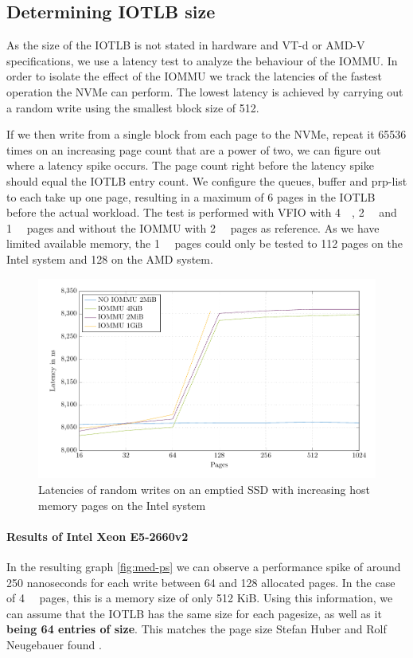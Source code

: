 \subsection{Determining IOTLB size}
As the size of the IOTLB is not stated in hardware and VT-d or AMD-V specifications, we use a latency test to analyze the behaviour of the IOMMU.
In order to isolate the effect of the IOMMU we track the latencies of the fastest operation the NVMe can perform. The lowest latency is achieved by carrying out a random write using the smallest block size of \qty{512}{\byte}.

If we then write from a single block from each page to the NVMe, repeat it 65536 times on an increasing page count that are a power of two, we can figure out where a latency spike occurs. The page count right before the latency spike should equal the IOTLB entry count. We configure the queues, buffer and prp-list to each take up one page, resulting in a maximum of 6 pages in the IOTLB before the actual workload.
The test is performed with VFIO with \qty{4}{\kibi\byte}, \qty{2}{\mebi\byte} and \qty{1}{\gibi\byte} pages and without the IOMMU with \qty{2}{\mebi\byte} pages as reference. As we have limited available memory, the \qty{1}{\gibi\byte} pages could only be tested to 112 pages on the Intel system and 128 on the AMD system.

\begin{figure}[H]
  \centering
  \includegraphics[width=\textwidth]{figures/psmeds}
  \caption{Latencies of random writes on an emptied SSD with increasing host memory pages on the Intel system}
  \label{fig:med-ps}
\end{figure}

\paragraph{Results of Intel Xeon E5-2660v2}
In the resulting graph \autoref{fig:med-ps} we can observe a performance spike of around 250 nanoseconds for each write between 64 and 128 allocated pages. In the case of \qty{4}{\kibi\byte} pages, this is a memory size of only 512 KiB. Using this information, we can assume that the IOTLB has the same size for each pagesize, as well as it \textbf{being 64 entries of size}. This matches the page size Stefan Huber and Rolf Neugebauer found \cite{iommuhuber}\cite{pcieperfnegebauer}.

